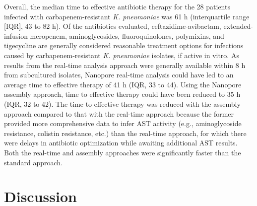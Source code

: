 Overall, the median time to effective antibiotic therapy for the 28 patients infected with carbapenem-resistant \textit{K. pneumoniae} was 61 h (interquartile range [IQR], 43 to 82 h). Of the antibiotics evaluated, ceftazidime-avibactam, extended-infusion meropenem, aminoglycosides, fluoroquinolones, polymixins, and tigecycline are generally considered reasonable treatment options for infections caused by carbapenem-resistant \textit{K. pneumoniae} isolates, if active in vitro. As results from the real-time analysis approach were generally available within 8 h from subcultured isolates, Nanopore real-time analysis could have led to an average time to effective therapy of 41 h (IQR, 33 to 44). Using the Nanopore assembly approach, time to effective therapy could have been reduced to 35 h (IQR, 32 to 42). The time to effective therapy was reduced with the assembly approach compared to that with the real-time approach because the former provided more comprehensive data to infer AST activity (e.g., aminoglycoside resistance, colistin resistance, etc.) than the real-time approach, for which there were delays in antibiotic optimization while awaiting additional AST results. Both the real-time and assembly approaches were significantly faster than the standard approach.


\section{Discussion}
\label{sec:discuss}

